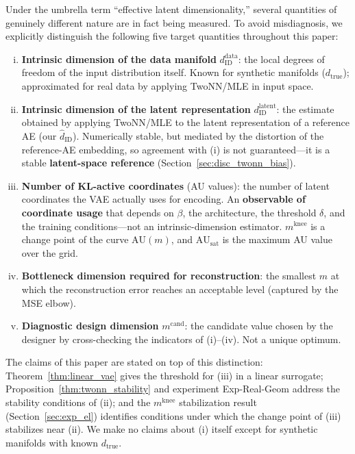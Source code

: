 \documentclass[make,article,submit,pdftex,moreauthors]{Definitions/mdpi}
\newcommand{\dzopt}{m^{\mathrm{cand}}}
\newcommand{\dtrue}{d_{\mathrm{true}}}
\newcommand{\AUsat}{\mathrm{AU}_{\mathrm{sat}}}
\newcommand{\mknee}{m^{\mathrm{knee}}}
\begin{document}
Under the umbrella term ``effective latent dimensionality,'' several quantities
of genuinely different nature are in fact being measured.
To avoid misdiagnosis, we explicitly distinguish the following five target
quantities throughout this paper:
\begin{enumerate}[(i)]
  \item \textbf{Intrinsic dimension of the data manifold} $d_\mathrm{ID}^\mathrm{data}$:
        the local degrees of freedom of the input distribution itself.
        Known for synthetic manifolds ($\dtrue$); approximated for real data by
        applying TwoNN/MLE in input space.
  \item \textbf{Intrinsic dimension of the latent representation}
        $d_\mathrm{ID}^\mathrm{latent}$:
        the estimate obtained by applying TwoNN/MLE to the latent representation of a
        reference AE (our $\hat{d}_\mathrm{ID}$).
        Numerically stable, but mediated by the distortion of the reference-AE
        embedding, so agreement with (i) is not guaranteed---it is a stable
        \textbf{latent-space reference} (Section~\ref{sec:disc_twonn_bias}).
  \item \textbf{Number of KL-active coordinates} (AU values):
        the number of latent coordinates the VAE actually uses for encoding.
        An \textbf{observable of coordinate usage} that depends on $\beta$, the
        architecture, the threshold $\delta$, and the training conditions---not an
        intrinsic-dimension estimator.
        $\mknee$ is a change point of the curve $\mathrm{AU}(m)$, and $\AUsat$ is the
        maximum AU value over the grid.
  \item \textbf{Bottleneck dimension required for reconstruction}:
        the smallest $m$ at which the reconstruction error reaches an acceptable
        level (captured by the MSE elbow).
  \item \textbf{Diagnostic design dimension} $\dzopt$:
        the candidate value chosen by the designer by cross-checking the indicators
        of (i)--(iv).  Not a unique optimum.
\end{enumerate}
The claims of this paper are stated on top of this distinction:
Theorem~\ref{thm:linear_vae} gives the threshold for (iii) in a linear surrogate;
Proposition~\ref{thm:twonn_stability} and experiment Exp-Real-Geom address the
stability conditions of (ii); and the $\mknee$ stabilization result
(Section~\ref{sec:exp_el}) identifies conditions under which the change point of
(iii) stabilizes near (ii).
We make no claims about (i) itself except for synthetic manifolds with known
$\dtrue$.
\end{document}
